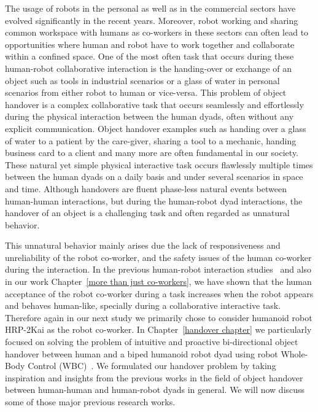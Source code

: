 The usage of robots in the personal as well as in the commercial sectors have evolved significantly in the recent years. Moreover, robot working and sharing common workspace with humans as co-workers in these sectors can often lead to opportunities where human and robot have to work together and collaborate within a confined space. One of the most often task that occurs during these human-robot collaborative interaction is the handing-over or exchange of an object such as tools in industrial scenarios or a glass of water in personal scenarios from either robot to human or vice-versa. This problem of object handover is a complex collaborative task that occurs seamlessly and effortlessly during the physical interaction between the human dyads, often without any explicit communication.  Object handover examples such as handing over a glass of water to a patient by the care-giver, sharing a tool to a mechanic, handing business card to a client and many more are often fundamental in our society. These natural yet simple physical interactive task occurs flawlessly multiple times between the human dyads on a daily basis and under several scenarios in space and time. Although handovers are fluent phase-less natural events between human-human interactions, but during the human-robot dyad interactions, the handover of an object is a challenging task and often regarded as unnatural behavior. 

This unnatural behavior mainly arises due the lack of responsiveness and unreliability of the robot co-worker, and the safety issues of the human co-worker during the interaction. In the previous human-robot interaction studies~\cite{huber2008human, strabala2013toward, shibata1995experimental} and also in our work Chapter~\ref{more than just co-workers}, we have shown that the human acceptance of the robot co-worker during a task increases when the robot appears and behaves human-like, specially during a collaborative interactive task. Therefore again in our next study we primarily chose to consider humanoid robot HRP-2Kai as the robot co-worker. In Chapter~\ref{handover chapter} we particularly focused on solving the problem of intuitive and proactive bi-directional object handover between human and a biped humanoid robot dyad using robot Whole-Body Control (WBC)~\cite{ladder-HRP-2Kai, bouyarmane2011using, sentis2006whole}. We formulated our handover problem by taking inspiration and insights from the previous works in the field of object handover between human-human and human-robot dyads in general. We will now discuss some of those major previous research works.

